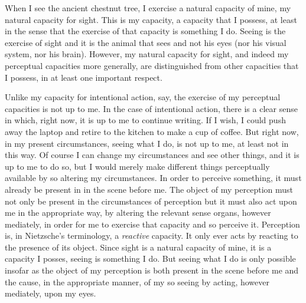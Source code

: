 \documentclass[12pt]{article}
\begin{document}
When I see the ancient chestnut tree, I exercise a natural capacity of mine, my natural capacity for sight. This is my capacity, a capacity that I possess, at least in the sense that the exercise of that capacity is something I do. Seeing is the exercise of sight and it is the animal that sees and not his eyes (nor his visual system, nor his brain). However, my natural capacity for sight, and indeed my perceptual capacities more generally, are distinguished from other capacities that I possess, in at least one important respect. 

Unlike my capacity for intentional action, say, the exercise of my perceptual capacities is not up to me. In the case of intentional action, there is a clear sense in which, right now, it is up to me to continue writing. If I wish, I could push away the laptop and retire to the kitchen to make a cup of coffee. But right now, in my present circumstances, seeing what I do, is not up to me, at least not in this way. Of course I can change my circumstances and see other things, and it is up to me to do so, but I would merely make different things perceptually available by so altering my circumstances. In order to perceive something, it must already be present in in the scene before me. The object of my perception must not only be present in the circumstances of perception but it must also act upon me in the appropriate way, by altering the relevant sense organs, however mediately, in order for me to exercise that capacity and so perceive it. Perception is, in Nietzsche's terminology, a \emph{reactive} capacity. It only ever acts by reacting to the presence of its object. Since sight is a natural capacity of mine, it is a capacity I posses, seeing is something I do. But seeing what I do is only possible insofar as the object of my perception is both present in the scene before me and the cause, in the appropriate manner, of my so seeing by acting, however mediately, upon my eyes.



\end{document}

